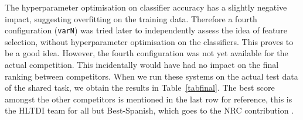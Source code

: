 \begin{table}
\footnotesize
\noindent{}
\caption{Results on the trial data}
\label{tabpar}
\end{table}
 
The hyperparameter optimisation on classifier accuracy has a slightly negative
impact, suggesting overfitting on the training data. Therefore a fourth
configuration (\texttt{varN}) was tried later to independently assess the idea
of feature selection, without hyperparameter optimisation on the classifiers.
This proves to be a good idea. However, the fourth configuration was not yet
available for the actual competition. This incidentally would have had no
impact on the final ranking between competitors. When we run these systems on
the actual test data of the shared task, we obtain the results in
Table~\ref{tabfinal}. The best score amongst the other competitors is mentioned
in the last row for reference, this is the HLTDI team \citep{HLTDI} for all but
Best-Spanish, which goes to the NRC contribution \citep{CARPUAT}.

